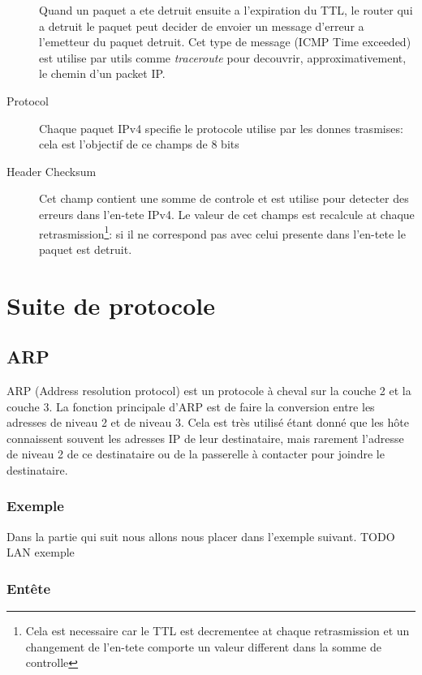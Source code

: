 \documentclass[twoside,openright,a4paper,11pt,french]{article}
\begin{document}
\begin{description}
Quand un paquet a ete detruit ensuite a l'expiration du TTL, le router qui a
detruit le paquet peut decider de envoier un message d'erreur a l'emetteur du
paquet detruit. Cet type de message (ICMP Time exceeded) est utilise par
utils comme {\it traceroute} pour decouvrir, approximativement, le chemin 
d'un packet IP.

\item [Protocol]
Chaque paquet IPv4 specifie le protocole utilise par les donnes trasmises:
cela est l'objectif de ce champs de 8 bits 

\item [Header Checksum]
Cet champ contient une somme de controle et est utilise pour detecter des 
erreurs dans l'en-tete IPv4. Le valeur de cet champs est recalcule at
chaque retrasmission\footnote {Cela est necessaire car le TTL est decrementee
at chaque retrasmission et un changement de l'en-tete comporte un valeur different
dans la somme de controlle}: si il ne correspond pas avec celui 
presente dans l'en-tete le paquet est detruit.







\end{description}




\section{Suite de protocole}

\subsection{ARP}
ARP (Address resolution protocol) est un protocole à cheval sur la couche 2 et
la couche 3. La fonction principale d'ARP est de faire la conversion entre les
adresses de niveau 2 et de niveau 3. Cela est très utilisé étant donné que les
hôte connaissent souvent les adresses IP de leur destinataire, mais rarement
l'adresse de niveau 2 de ce destinataire ou de la passerelle à contacter pour joindre
le destinataire.

\subsubsection{Exemple}
Dans la partie qui suit nous allons nous placer dans l'exemple suivant.
TODO LAN exemple
\subsubsection{Entête}
\end{document}

